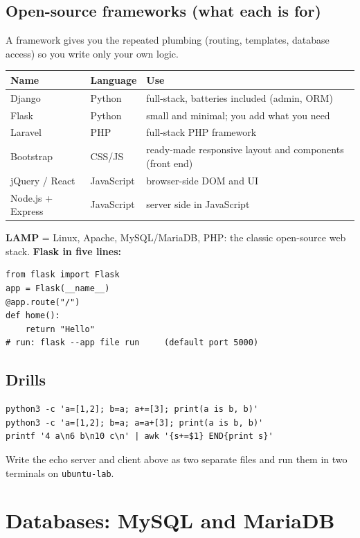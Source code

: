 \documentclass[11pt,a4paper]{article}
\begin{document}
\subsection{Open-source frameworks (what each is for)}
A framework gives you the repeated plumbing (routing, templates, database access) so you write only your own logic.
\begin{center}\small\renewcommand{\arraystretch}{1.18}\setlength{\tabcolsep}{9pt}
\begin{tabularx}{\linewidth}{@{}>{\raggedright\arraybackslash}X>{\raggedright\arraybackslash}X>{\raggedright\arraybackslash}X@{}}
\toprule
\textbf{\color{slate}Name} & \textbf{\color{slate}Language} & \textbf{\color{slate}Use} \\ \midrule
Django & Python & full-stack, batteries included (admin, ORM) \\
Flask & Python & small and minimal; you add what you need \\
Laravel & PHP & full-stack PHP framework \\
Bootstrap & CSS/JS & ready-made responsive layout and components (front end) \\
jQuery / React & JavaScript & browser-side DOM and UI \\
Node.js + Express & JavaScript & server side in JavaScript \\
\bottomrule
\end{tabularx}\end{center}
\textbf{LAMP} = Linux, Apache, MySQL/MariaDB, PHP: the classic open-source web stack.
\textbf{Flask in five lines:}
\begin{lstlisting}
from flask import Flask
app = Flask(__name__)
@app.route("/")
def home():
    return "Hello"
# run: flask --app file run     (default port 5000)
\end{lstlisting}

\subsection*{Drills}
\begin{lstlisting}
python3 -c 'a=[1,2]; b=a; a+=[3]; print(a is b, b)'
python3 -c 'a=[1,2]; b=a; a=a+[3]; print(a is b, b)'
printf '4 a\n6 b\n10 c\n' | awk '{s+=$1} END{print s}'
\end{lstlisting}
Write the echo server and client above as two separate files and run them in two terminals on \texttt{ubuntu-lab}.

\clearpage
\section{Databases: MySQL and MariaDB}
\end{document}

